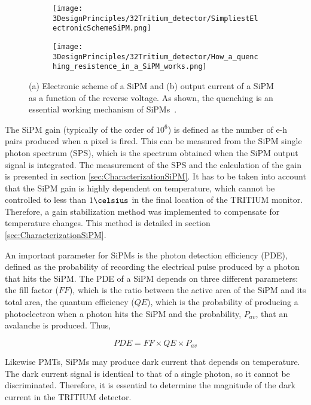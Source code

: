 \begin{figure}
\centering
    \begin{subfigure}[]{0.45\textwidth}
    \centering
    \texttt{[image: 3DesignPrinciples/32Tritium\_detector/SimpliestElectronicSchemeSiPM.png]}  
    \caption{\label{subfig:ElectricModelSiPM}}
    \end{subfigure}
    \hfill
    \begin{subfigure}[]{0.45\textwidth}
    \centering
    \texttt{[image: 3DesignPrinciples/32Tritium\_detector/How\_a\_quenching\_resistence\_in\_a\_SiPM\_works.png]}  
    \caption{\label{subfig:HowSiPMworks}}
    \end{subfigure}
 \caption{(a) Electronic scheme of a SiPM and (b) output current of a SiPM as a function of the reverse voltage. As shown, the quenching is an essential working mechanism of SiPMs~\cite{DataSheetSensL}.}
 \label{fig:ChenchingResistance}
\end{figure}

The SiPM gain (typically of the order of $10^6$) is defined as the number of e-h pairs produced when a pixel is fired. This can be measured from the SiPM single photon spectrum (SPS), which is the spectrum obtained when the SiPM output signal is integrated. The measurement of the SPS and the calculation of the gain is presented in section \ref{sec:CharacterizationSiPM}. It has to be taken into account that the SiPM gain is highly dependent on temperature, which cannot be controlled to less than $1\celsius$ in the final location of the TRITIUM monitor. Therefore, a gain stabilization method was implemented to compensate for temperature changes. This method is detailed in section \ref{sec:CharacterizationSiPM}.

An important parameter for SiPMs is the photon detection efficiency (PDE), defined as the probability of recording the electrical pulse produced by a photon that hits the SiPM. The PDE of a SiPM depends on three different parameters: the fill factor ($FF$), which is the ratio between the active area of the SiPM and its total area, the quantum efficiency ($QE$), which is the probability of producing a photoelectron when a photon hits the SiPM and the probability, $P_{av}$, that an avalanche is produced. Thus, 

\begin{equation}
PDE=FF \times QE \times P_{av}
\label{PDE_SiPM}
\end{equation}

Likewise PMTs, SiPMs may produce dark current that depends on temperature. The dark current signal is identical to that of a single photon, so it cannot be discriminated. Therefore, it is essential to determine the magnitude of the dark current in the TRITIUM detector.

